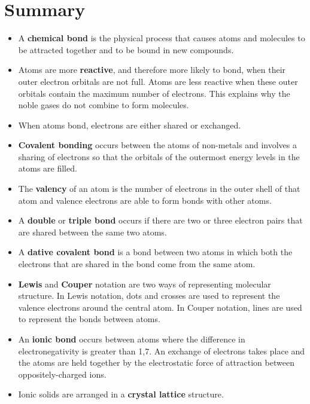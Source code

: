             \section{Summary}
            \nopagebreak
      \label{m38689*id147386}\begin{itemize}[noitemsep]
            \label{m38689*uid136}\item A \textbf{chemical bond} is the physical process that causes atoms and molecules to be attracted together and to be bound in new compounds.
\label{m38689*uid137}\item Atoms are more \textbf{reactive}, and therefore more likely to bond, when their outer electron orbitals are not full. Atoms are less reactive when these outer orbitals contain the maximum number of electrons. This explains why the noble gases do not combine to form molecules.
\label{m38689*uid142}\item When atoms bond, electrons are either shared or exchanged.
\label{m38689*uid143}\item \textbf{Covalent bonding} occurs between the atoms of non-metals and involves a sharing of electrons so that the orbitals of the outermost energy levels in the atoms are filled.
\label{m38689*uid144}\item The \textbf{valency} of an atom is the number of electrons in the outer shell of that atom and valence electrons are able to form bonds with other atoms.
\label{m38689*uid145}\item A \textbf{double} or \textbf{triple bond} occurs if there are two or three electron pairs that are shared between the same two atoms.
\label{m38689*uid146}\item A \textbf{dative covalent bond} is a bond between two atoms in which both the electrons that are shared in the bond come from the same atom.
\label{m38689*uid147}\item \textbf{Lewis} and \textbf{Couper} notation are two ways of representing molecular structure. In Lewis notation, dots and crosses are used to represent the valence electrons around the central atom. In Couper notation, lines are used to represent the bonds between atoms.
\label{m38689*uid150}\item An \textbf{ionic bond} occurs between atoms where the difference in electronegativity is greater than 1,7. An exchange of electrons takes place and the atoms are held together by the electrostatic force of attraction between oppositely-charged ions.
\label{m38689*uid151}\item Ionic solids are arranged in a \textbf{crystal lattice} structure.

\end{itemize}
